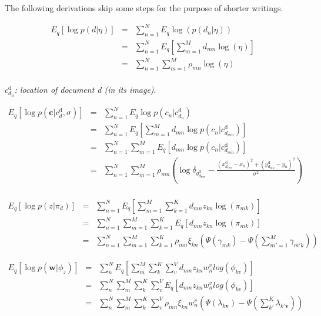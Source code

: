\documentclass[]{article}
\begin{document}
The following derivations skip some steps for the purpose of shorter writings.

\begin{eqnarray}
E_q [\log p(d | \eta)] 
&=& \sum\limits_{n=1}^{N} E_q \log(p(d_n | \eta)) \\
&=& \sum\limits_{n=1}^{N} E_q \left\lbrack \sum\limits_{m=1}^{M} d_{mn} \log(\eta) \right\rbrack\\
&=& \sum\limits_{n=1}^{N} \sum\limits_{m=1}^{M} \rho_{mn} \log(\eta) \\
\end{eqnarray}

\textit{$c_{d_n}^{\mathrm{d}}$: location of document d (in its image)}.

\begin{eqnarray}
E_q [\log p(\boldsymbol{c} | c^{\mathrm{d}}_d, \sigma)] 
&=& \sum\limits_{n=1}^{N} E_q \log p(c_n | c_{d_n}^{\mathrm{d}}) \\
&=& \sum\limits_{n=1}^{N} E_q \left\lbrack \sum\limits_{m=1}^{M}  d_{mn} \log p(c_n | c_{d_{mn}}^{\mathrm{d}}) \right\rbrack \\
&=& \sum\limits_{n=1}^{N} \sum\limits_{m=1}^{M} E_q [d_{mn} \log p(c_n | c_{d_{mn}}^{\mathrm{d}})]  \\
&=& \sum\limits_{n=1}^{N} \sum\limits_{m=1}^{M} \rho_{mn} (\log \delta_{g_{d_{mn}}^{\mathrm{d}}} - \frac{(x_{d_{mn}}^{\mathrm{d}} - x_n)^2 + (y_{d_{mn}}^{\mathrm{d}} - y_n)^2}{\sigma^2})\\
\end{eqnarray}

\begin{eqnarray}
E_q[\log p(z | \pi_d)]
&=& \sum\limits_{n=1}^{N} E_q \left\lbrack \sum\limits_{m=1}^{M} \sum\limits_{k=1}^{K} d_{mn} z_{kn} \log(\pi_{mk}) \right\rbrack \\
&=& \sum\limits_{n=1}^{N} \sum\limits_{m=1}^{M} \sum\limits_{k=1}^{K} E_q[d_{mn} z_{kn} \log(\pi_{mk})] \\
&=& \sum\limits_{n=1}^{N} \sum\limits_{m=1}^{M} \sum\limits_{k=1}^{K} \rho_{mn} \xi_{kn} (\Psi(\gamma_{mk}) - \Psi(\sum\limits_{m'=1}^{M} \gamma_{m'k}))
\end{eqnarray}

\begin{eqnarray}
E_q [\log p(\boldsymbol{w} | \phi_z)]
&=& \sum\limits_{n}^{N} E_q \left\lbrack \sum\limits_{m}^{M} \sum\limits_{k}^{K} \sum\limits_{v}^{V} d_{mn} z_{kn} w^v_n log(\phi_{kv}) \right\rbrack \\
&=& \sum\limits_{n}^{N} \sum\limits_{m}^{M} \sum\limits_{k}^{K} \sum\limits_{v}^{V} E_q[d_{mn} z_{kn} w^v_n log(\phi_{kv})] \\
&=& \sum\limits_{n}^{N} \sum\limits_{m}^{M} \sum\limits_{k}^{K} \sum\limits_{v}^{V} \rho_{mn} \xi_{kn} w_n^v (\Psi(\lambda_{k\boldsymbol{v}}) - \Psi(\sum\limits_{k'}^{K} \lambda_{k'\boldsymbol{v}})) \\
\end{eqnarray}
\end{document}
